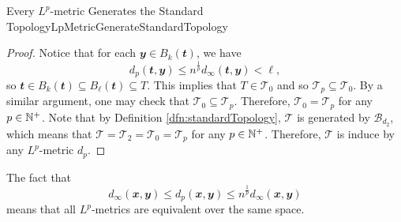 \documentclass[math, code]{amznotes}
\theoremstyle{remark}
\begin{document}
\begin{probox}{Every $L^p$-metric Generates the Standard Topology}{LpMetricGenerateStandardTopology}
\begin{proof}
        Notice that for each $\mathbfit{y} \in B_{k}\left(\mathbfit{t}\right)$, we have 
        \begin{equation*}
            d_p\left(\mathbfit{t}, \mathbfit{y}\right) \leq n^{\frac{1}{p}}d_{\infty}\left(\mathbfit{t}, \mathbfit{y}\right) < \ell,
        \end{equation*}
        so $\mathbfit{t} \in B_{k}\left(\mathbfit{t}\right) \subseteq B_{\ell}\left(\mathbfit{t}\right) \subseteq T$. This implies that $T \in \mathcal{T}_0$ and so $\mathcal{T}_p \subseteq \mathcal{T}_0$. By a similar argument, one may check that $\mathcal{T}_0 \subseteq \mathcal{T}_p$. Therefore, $\mathcal{T}_0 = \mathcal{T}_p$ for any $p \in \mathbb{N}^+$. Note that by Definition \ref{dfn:standardTopology}, $\mathcal{T}$ is generated by $\mathcal{B}_{d_2}$, which means that $\mathcal{T} = \mathcal{T}_2 = \mathcal{T}_0 = \mathcal{T}_p$ for any $p \in \mathbb{N}^+$. Therefore, $\mathcal{T}$ is induce by any $L^p$-metric $d_p$.
    \end{proof}
\end{probox}
The fact that
\begin{equation*}
    d_{\infty}\left(\mathbfit{x}, \mathbfit{y}\right) \leq d_p\left(\mathbfit{x}, \mathbfit{y}\right) \leq n^{\frac{1}{p}}d_{\infty}\left(\mathbfit{x}, \mathbfit{y}\right)
\end{equation*}
means that all $L^p$-metrics are equivalent over the same space.
\end{document}
